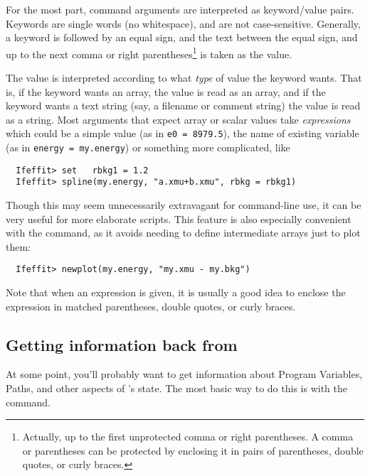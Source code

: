For the most part, command arguments are interpreted as keyword/value
pairs.  Keywords are single words (no whitespace), and are not
case-sensitive. Generally, a keyword is followed by an equal sign, and the
text between the equal sign, and up to the next comma or right
parentheses\footnote{Actually, up to the first unprotected comma or right
  parentheses.  A comma or parentheses can be protected by enclosing it in
  pairs of parentheses, double quotes, or curly braces.} is taken as the
value.

The value is interpreted according to what {\emph{type}} of value the
keyword wants.  That is, if the keyword wants an array, the value is read
as an array, and if the keyword wants a text string (say, a filename or
comment string) the value is read as a string.  Most arguments that expect
array or scalar values take {\emph{expressions}} which could be a simple
value (as in {\texttt{e0 = 8979.5}}), the name of existing variable (as in
{\texttt{energy = my.energy}}) or something more complicated, like
\begin{verbatim}
  Ifeffit> set   rbkg1 = 1.2
  Ifeffit> spline(my.energy, "a.xmu+b.xmu", rbkg = rbkg1)
\end{verbatim}
\noindent
Though this may seem unnecessarily extravagant for command-line use, it can
be very useful for more elaborate scripts.  This feature is also especially
convenient with the {} command, as it avoids needing to define
intermediate arrays just to plot them:
\begin{verbatim}
  Ifeffit> newplot(my.energy, "my.xmu - my.bkg")
\end{verbatim}
\noindent
Note that when an expression is given, it is usually a good idea to enclose
the expression in matched parentheses, double quotes, or curly braces. 


\subsection{Getting information back from {\ifeffit}}
\label{Ch:Structure-info}  

At some point, you'll probably want to get information about Program
Variables, Paths, and other aspects of {\ifeffit}'s state.
The most basic way to do this is with the {} command.

